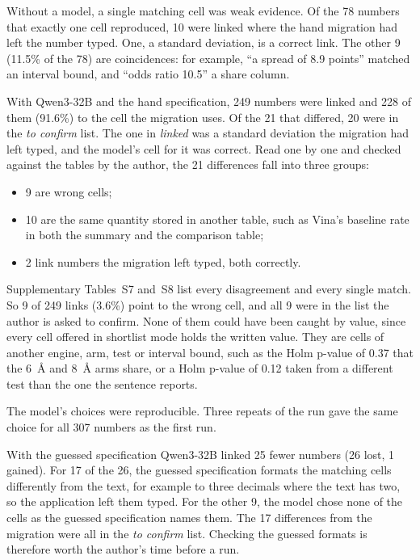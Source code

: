 Without a model, a single matching cell was weak evidence. Of the 78 numbers that exactly one cell
reproduced, 10 were linked where the hand migration had left the number typed. One, a standard
deviation, is a correct link. The other 9 (11.5\% of the 78) are coincidences: for example, ``a
spread of 8.9 points'' matched an interval bound, and ``odds ratio 10.5'' a share column.

With Qwen3-32B and the hand specification, 249 numbers were linked and 228 of them (91.6\%) to the
cell the migration uses. Of the 21 that differed, 20 were in the \emph{to confirm} list. The one in
\emph{linked} was a standard deviation the migration had left typed, and the model's cell for it
was correct. Read one by one and checked against the tables by the author, the 21 differences
fall into three groups:
\begin{itemize}
\item 9 are wrong cells;
\item 10 are the same quantity stored in another table, such as Vina's baseline rate in both the
summary and the comparison table;
\item 2 link numbers the migration left typed, both correctly.
\end{itemize}
Supplementary Tables~S7 and~S8 list every disagreement and every single match. So 9 of 249 links
(3.6\%) point to the wrong cell, and all 9 were in the list the author is asked to confirm. None
of them could have been caught by value, since every cell offered in shortlist mode holds the
written value. They are cells of another engine, arm, test or interval bound, such as the Holm
p-value of 0.37 that the 6~\AA{} and 8~\AA{} arms share, or a Holm p-value of 0.12 taken from a
different test than the one the sentence reports.

The model's choices were reproducible. Three repeats of the run gave the same choice for all 307
numbers as the first run.

With the guessed specification Qwen3-32B linked 25 fewer numbers (26 lost, 1 gained). For 17
of the 26, the guessed specification formats the matching cells differently from the text, for
example to three decimals where the text has two, so the application left them typed. For the
other 9, the model chose none of the cells as the guessed specification names them. The 17
differences from the migration were all in the \emph{to confirm} list. Checking the guessed
formats is therefore worth the author's time before a run.
